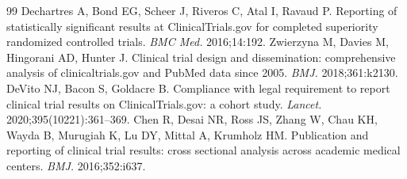 \documentclass[11pt]{article}
\begin{document}
\begin{thebibliography}{99}
 Dechartres A, Bond EG, Scheer J, Riveros C, Atal I, Ravaud P. Reporting of statistically significant results at ClinicalTrials.gov for completed superiority randomized controlled trials. \emph{BMC Med.} 2016;14:192.
 Zwierzyna M, Davies M, Hingorani AD, Hunter J. Clinical trial design and dissemination: comprehensive analysis of clinicaltrials.gov and PubMed data since 2005. \emph{BMJ.} 2018;361:k2130.
 DeVito NJ, Bacon S, Goldacre B. Compliance with legal requirement to report clinical trial results on ClinicalTrials.gov: a cohort study. \emph{Lancet.} 2020;395(10221):361--369.
 Chen R, Desai NR, Ross JS, Zhang W, Chau KH, Wayda B, Murugiah K, Lu DY, Mittal A, Krumholz HM. Publication and reporting of clinical trial results: cross sectional analysis across academic medical centers. \emph{BMJ.} 2016;352:i637.
\end{thebibliography}
\end{document}
